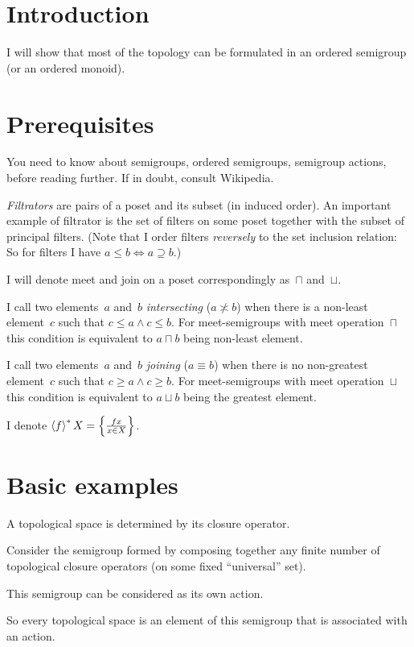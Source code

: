 \chapter{Introduction}

I will show that most of the topology can be formulated in an ordered semigroup (or an ordered monoid).

\chapter{Prerequisites}

You need to know about semigroups, ordered semigroups, semigroup actions, before reading further. If in doubt, consult Wikipedia.

\emph{Filtrators} are pairs of a poset and its subset (in induced order). An important example of filtrator is the set of filters on some poset together with the subset of principal filters. (Note that I order filters \emph{reversely} to the set inclusion relation: So for filters I have $a\leq b \Leftrightarrow a\supseteq b$.)

I will denote meet and join on a poset correspondingly as~$\sqcap$ and~$\sqcup$.

I call two elements~$a$ and~$b$ \emph{intersecting} ($a\nasymp b$) when there is a non-least element~$c$ such that $c\leq a\land c\leq b$. For meet-semigroups with meet operation~$\sqcap$ this condition is equivalent to $a\sqcap b$ being non-least element.

I call two elements~$a$ and~$b$ \emph{joining} ($a\equiv b$) when there is no non-greatest element~$c$ such that $c\geq a\land c\geq b$. For meet-semigroups with meet operation~$\sqcup$ this condition is equivalent to $a\sqcup b$ being the greatest element.

I denote $\left\langle f\right\rangle ^{\ast}X = \left\{ \frac{fx}{x\in X}\right\}$.

\chapter{Basic examples}

A topological space is determined by its closure operator.

Consider the semigroup formed by composing together any finite number of topological closure operators (on some fixed ``universal'' set).

This semigroup can be considered as its own action.

So every topological space is an element of this semigroup that is associated with an action.

